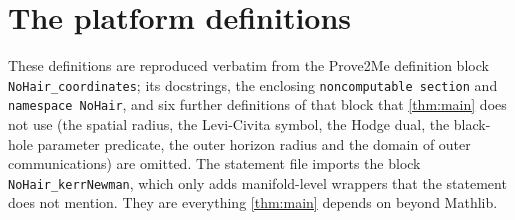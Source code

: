 \documentclass[11pt]{article}
\theoremstyle{definition}
\theoremstyle{remark}
\newcommand{\lean}[1]{\lstinline[basicstyle=\ttfamily\normalsize,columns=fullflexible,breaklines=false]{#1}}
\begin{document}



\appendix
\section{The platform definitions}\label{app:defs}

These definitions are reproduced verbatim from the Prove2Me definition block \texttt{NoHair\_coordinates}; its docstrings, the enclosing \lean{noncomputable section} and \lean{namespace NoHair}, and six further definitions of that block that \cref{thm:main} does not use (the spatial radius, the Levi-Civita symbol, the Hodge dual, the black-hole parameter predicate, the outer horizon radius and the domain of outer communications) are omitted. The statement file imports the block \texttt{NoHair\_kerrNewman}, which only adds manifold-level wrappers that the statement does not mention.
They are everything \cref{thm:main} depends on beyond Mathlib.
\end{document}
